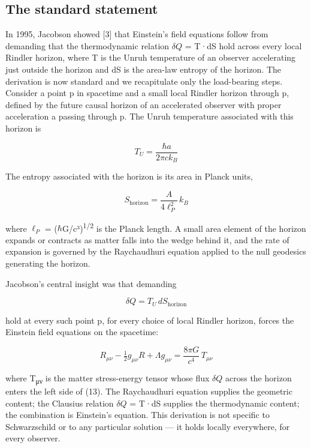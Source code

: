 \documentclass[11pt]{article}
\begin{document}
\subsection{The standard statement}

In 1995, Jacobson showed [3] that Einstein's field equations follow
from demanding that the thermodynamic relation $\delta Q$ = T·dS hold across
every local Rindler horizon, where T is the Unruh temperature of an
observer accelerating just outside the horizon and dS is the area-law
entropy of the horizon. The derivation is now standard and we
recapitulate only the load-bearing steps. Consider a point p in
spacetime and a small local Rindler horizon through p, defined by the
future causal horizon of an accelerated observer with proper
acceleration a passing through p. The Unruh temperature associated with
this horizon is

\begin{equation}
  T_{U} = \frac{\hbar a}{2\pi c k_{B}}
  \label{eq:11}
\end{equation}

The entropy associated with the horizon is its area in Planck units,

\begin{equation}
  S_{\mathrm{horizon}} = \frac{A}{4\ell_{P}^{2}}\, k_{B}
  \label{eq:12}
\end{equation}

where $\ell_{P}$ = ($\hbar$G/c³)\textsuperscript{1/2} is the Planck length. A small area element of
the horizon expands or contracts as matter falls into the wedge behind
it, and the rate of expansion is governed by the Raychaudhuri equation
applied to the null geodesics generating the horizon.

Jacobson's central insight was that demanding

\begin{equation}
  \delta Q = T_{U}\, dS_{\mathrm{horizon}}
  \label{eq:13}
\end{equation}

hold at every such point p, for every choice of local Rindler horizon,
forces the Einstein field equations on the spacetime:

\begin{equation}
  R_{\mu\nu} - \tfrac{1}{2} g_{\mu\nu} R + \Lambda g_{\mu\nu} = \frac{8\pi G}{c^{4}}\, T_{\mu\nu}
  \label{eq:14}
\end{equation}

where T\textsubscript{μν} is the matter stress-energy tensor whose flux $\delta Q$ across the
horizon enters the left side of (13). The Raychaudhuri equation supplies
the geometric content; the Clausius relation $\delta Q$ = T·dS supplies the
thermodynamic content; the combination is Einstein's equation. This
derivation is not specific to Schwarzschild or to any particular
solution --- it holds locally everywhere, for every observer.
\end{document}
